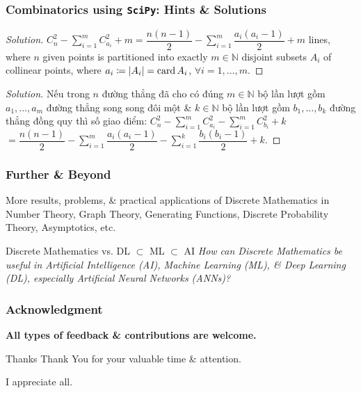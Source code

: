 \documentclass{beamer}
\begin{document}
\begin{frame}
	\frametitle{Combinatorics using {\tt SciPy}: Hints \& Solutions}
	
	\begin{proof}[Solution]
		$C_n^2 - \sum_{i=1}^m C_{a_i}^2 + m = \dfrac{n(n - 1)}{2} - \sum_{i=1}^m \dfrac{a_i(a_i - 1)}{2} + m$ lines, where $n$ given points is partitioned into exactly $m\in\mathbb{N}$ disjoint subsets $A_i$ of collinear points, where $a_i\coloneqq|A_i| = {\rm card}\,A_i$, $\forall i = 1,\ldots,m$.
	\end{proof}
	
	\begin{proof}[Solution]
		Nếu trong $n$ đường thẳng đã cho có đúng $m\in\mathbb{N}$ bộ lần lượt gồm $a_1,\ldots,a_m$ đường thẳng song song đôi một \& $k\in\mathbb{N}$ bộ lần lượt gồm $b_1,\ldots,b_k$ đường thẳng đồng quy thì số giao điểm: $C_n^2 - \sum_{i=1}^m C_{a_i}^2 - \sum_{i=1}^m C_{b_i}^2 + k$ $= \dfrac{n(n - 1)}{2} - \sum_{i=1}^m \dfrac{a_i(a_i - 1)}{2} - \sum_{i=1}^k \dfrac{b_i(b_i - 1)}{2} + k$.
	\end{proof}
\end{frame}

\begin{frame}
	\frametitle{Further \& Beyond}
	More results, problems, \& practical applications of Discrete Mathematics in Number Theory, Graph Theory, Generating Functions, Discrete Probability Theory, Asymptotics, etc.
	
	\begin{block}{Discrete Mathematics vs. DL $\subset$ ML $\subset$ AI}\it
		How can Discrete Mathematics be useful in Artificial Intelligence (AI), Machine Learning (ML), \& Deep Learning (DL), especially Artificial Neural Networks (ANNs)?
	\end{block}	
\end{frame}

\begin{frame}
	\frametitle{Acknowledgment}
	\begin{center}\Large\sf\bf
		All types of feedback \& contributions are welcome.
		\vspace{1cm}
		
		\begin{block}{Thanks}
			Thank You for your valuable time \& attention.
		\end{block}
		\vspace{1cm}
		
		I appreciate all.
	\end{center}
\end{frame}
\end{document}
